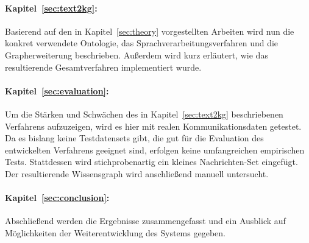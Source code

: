 \paragraph{Kapitel~\ref{sec:text2kg}: }
Basierend auf den in Kapitel~\ref{sec:theory} vorgestellten Arbeiten wird nun die konkret verwendete Ontologie, das Sprachverarbeitungsverfahren und die Grapherweiterung beschrieben.
Außerdem wird kurz erläutert, wie das resultierende Gesamtverfahren implementiert wurde.

\paragraph{Kapitel~\ref{sec:evaluation}: }
Um die Stärken und Schwächen des in Kapitel~\ref{sec:text2kg} beschriebenen Verfahrens aufzuzeigen, wird es hier mit realen Kommunikationsdaten getestet.
Da es bislang keine Testdatensets gibt, die gut für die Evaluation des entwickelten Verfahrens geeignet sind, erfolgen keine umfangreichen empirischen Tests.
Stattdessen wird stichprobenartig ein kleines Nachrichten-Set eingefügt.
Der resultierende Wissensgraph wird anschließend manuell untersucht.

\paragraph{Kapitel~\ref{sec:conclusion}: }
Abschließend werden die Ergebnisse zusammengefasst und ein Ausblick auf Möglichkeiten der Weiterentwicklung des Systems gegeben.
